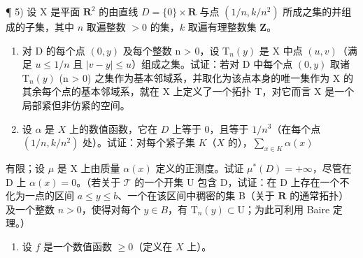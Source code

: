¶ 5) 设 X 是平面 \(\mathbf{R}^2\) 的由直线 \(D = \{0\} \times \mathbf{R}\) 与点 \((1/n, k/n^2)\) 所成之集的并组成的子集，其中 \(n\) 取遍整数 \(>0\) 的集，\(k\) 取遍有理整数集 \(\mathbf{Z}\)。

\begin{enumerate}
\def\labelenumi{\alph{enumi})}
\item
  对 D 的每个点 \((0,y)\) 及每个整数 n \textgreater{} 0，设 \(\mathrm{T}_{n}(y)\) 是 X 中点 \((u,v)\)（满足 \(u \leqslant 1/n\) 且 \(|v - y| \leqslant u\)）组成之集。试证：若对 D 中每个点 \((0,y)\) 取诸 \(\mathrm{T}_{n}(y)\) (n \textgreater{} 0) 之集作为基本邻域系，并取化为该点本身的唯一集作为 X 的其余每个点的基本邻域系，就在 X 上定义了一个拓扑 T，对它而言 X 是一个局部紧但非仿紧的空间。
\item
  设 \(\alpha\) 是 \(X\) 上的数值函数，它在 \(D\) 上等于 0，且等于 \(1/n^3\)（在每个点 \((1/n, k/n^2)\) 处）。试证：对每个紧子集 \(K\)（\(X\) 的），\(\sum_{x \in K} \alpha(x)\)
\end{enumerate}

有限；设 \(\mu\) 是 X 上由质量 \(\alpha(x)\) 定义的正测度。试证 \(\mu^{*}(D) = +\infty\)，尽管在 D 上 \(\alpha(x) = 0\)。（若关于 \(\mathcal{T}\) 的一个开集 U 包含 D，试证：在 D 上存在一个不化为一点的区间 \(a \leqslant y \leqslant b\)、一个在该区间中稠密的集 B（关于 \(\mathbf{R}\) 的通常拓扑）及一个整数 \(n > 0\)，使得对每个 \(y \in B\)，有 \(\mathrm{T}_{n}(y) \subset \mathrm{U}\)；为此可利用 Baire 定理。）

\begin{enumerate}
\def\labelenumi{\arabic{enumi})}
\setcounter{enumi}{5}
\tightlist
\item
  设 \(f\) 是一个数值函数 \(\geqslant 0\)（定义在 \(X\) 上）。
\end{enumerate}

